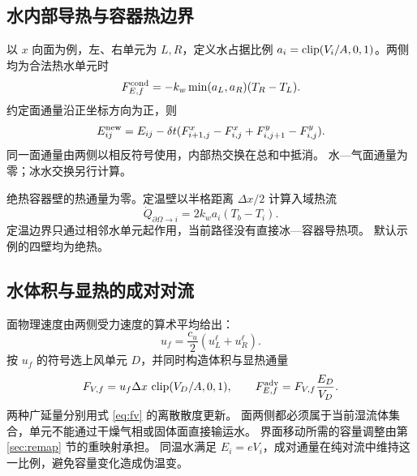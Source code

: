 \subsection{水内部导热与容器热边界}
以 $x$ 向面为例，左、右单元为 $L,R$，定义水占据比例
$a_i=\operatorname{clip}(V_i/A,0,1)$。两侧均为合法热水单元时
\begin{equation}
 F_{E,f}^{\rm cond}=-k_w\min(a_L,a_R)(T_R-T_L).
\end{equation}
约定面通量沿正坐标方向为正，则
\begin{equation}
 E_{ij}^{\rm new}=E_{ij}-\delta t
 (F^x_{i+1,j}-F^x_{i,j}+F^y_{i,j+1}-F^y_{i,j}).
 \label{eq:fv}
\end{equation}
同一面通量由两侧以相反符号使用，内部热交换在总和中抵消。
水—气面通量为零；冰水交换另行计算。

绝热容器壁的热通量为零。定温壁以半格距离 $\Delta x/2$ 计算入域热流
\begin{equation}
 \dot Q_{\partial\Omega\to i}=2k_wa_i(T_b-T_i).
\end{equation}
定温边界只通过相邻水单元起作用，当前路径没有直接冰—容器导热项。
默认示例的四壁均为绝热。

\subsection{水体积与显热的成对对流}
面物理速度由两侧受力速度的算术平均给出：
\begin{equation}
 u_f=\frac{c_u}{2}(u_L^\ell+u_R^\ell).
\end{equation}
按 $u_f$ 的符号选上风单元 $D$，并同时构造体积与显热通量
\begin{equation}
 F_{V,f}=u_f\Delta x\,\operatorname{clip}(V_D/A,0,1),\qquad
 F_{E,f}^{\rm adv}=F_{V,f}\frac{E_D}{V_D}.
 \label{eq:paired-flux}
\end{equation}
两种广延量分别用式 \eqref{eq:fv} 的离散散度更新。
面两侧都必须属于当前湿流体集合，单元不能通过干燥气相或固体面直接输运水。
界面移动所需的容量调整由第 \ref{sec:remap} 节的重映射承担。
同温水满足 $E_i=eV_i$，成对通量在纯对流中维持这一比例，避免容量变化造成伪温变。


